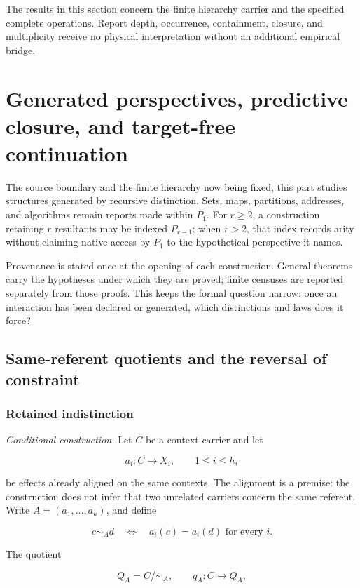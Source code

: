 \documentclass[11pt,a4paper]{article}
\begin{document}
The results in this section concern the finite hierarchy carrier and the
specified complete operations. Report depth, occurrence, containment,
closure, and multiplicity receive no physical interpretation without an
additional empirical bridge.

\section{Generated perspectives, predictive closure, and target-free
continuation}

The source boundary and the finite hierarchy now being fixed, this part
studies structures generated by recursive distinction. Sets, maps,
partitions, addresses, and algorithms remain reports made within
\(P_{1}\). For \(r \geq 2\), a construction retaining \(r\) resultants
may be indexed \(P_{r - 1}\); when \(r > 2\), that index records arity
without claiming native access by \(P_{1}\) to the hypothetical
perspective it names.

Provenance is stated once at the opening of each construction. General
theorems carry the hypotheses under which they are proved; finite
censuses are reported separately from those proofs. This keeps the
formal question narrow: once an interaction has been declared or
generated, which distinctions and laws does it force?

\subsection{Same-referent quotients and the reversal of
constraint}

\subsubsection{Retained
indistinction}

\emph{Conditional construction.} Let \(C\) be a context carrier and let

\[a_{i}:C \rightarrow X_{i},\quad\quad 1 \leq i \leq h,\]

be effects already aligned on the same contexts. The alignment is a
premise: the construction does not infer that two unrelated carriers
concern the same referent. Write
\(A = \left( a_{1},\ldots,a_{h} \right)\), and define

\[c \sim_{A}d\quad \Leftrightarrow \quad a_{i}(c) = a_{i}(d)\text{ for every }i.\]

The quotient

\[Q_{A} = C/ \sim_{A},\quad\quad q_{A}:C \rightarrow Q_{A},\]
\end{document}
